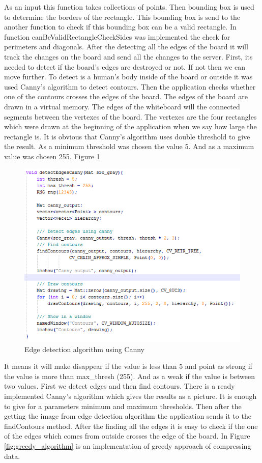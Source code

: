 As an input this function takes collections of points. Then bounding box is used to determine the borders of the rectangle. This bounding box is send to the another function to check if this bounding box can be a valid rectangle. In function canBeValidRectangleCheckSides was implemented the check for perimeters and diagonals. After the detecting all the edges of the board it will track the changes on the board and send all the changes to the server. First, its needed to detect if the board’s edges are destroyed or not. If not then we can move further. To detect is a human’s body inside of the board or outside it was used Canny’s algorithm to detect contours. Then the application checks whether one of the contours crosses the edges of the board. The edges of the board are drawn in a virtual memory. The edges of the whiteboard will the connected segments between the vertexes of the board. The vertexes are the four rectangles which were drawn at the beginning of the application when we say how large the rectangle is. It is obvious that Canny’s algorithm uses double threshold to give the result. As a minimum threshold was chosen the value 5. And as a maximum value was chosen 255. 
Figure \ref{fig:canny_edge_detection} 

\begin{figure}[h]
    \centering
    \includegraphics[]{Figures/canny_edge_detection}
    \caption{Edge detection algorithm using Canny}
    \label{fig:canny_edge_detection}
\end{figure}

It means it will make disappear if the value is less than 5 and point as strong if the value is more than max\_thresh (255). And as a weak if the value is between two values. First we detect edges and then find contours. There is a ready implemented Canny’s algorithm which gives the results as a picture. It is enough to give for a parameters minimum and maximum thresholds. Then after the getting the image from edge detection algorithm the application sends it to the findContours method. After the finding all the edges it is easy to check if the one of the edges which comes from outside crosses the edge of the board. In Figure \ref{fig:greedy_algorithm} is an implementation of greedy approach of compressing data.


